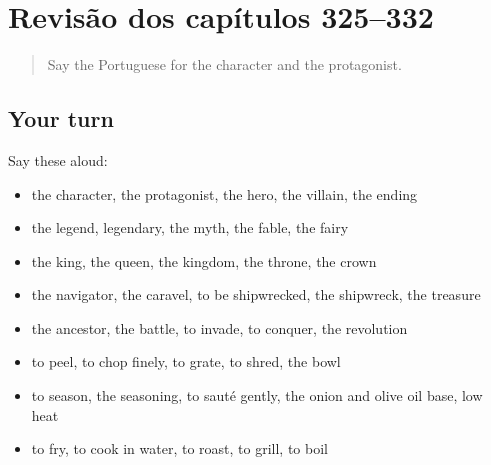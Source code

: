 \section[(dialogue)]{Revisão dos capítulos 325–332}

\label{lesson:PT-R332-revisao-325-332}



\begin{quote}
Say the Portuguese for the character and the protagonist.
\end{quote}

\subsection*{Your turn}
Say these aloud:

\begin{itemize}
\raggedright
  \item the character, the protagonist, the hero, the villain, the ending
  \item the legend, legendary, the myth, the fable, the fairy
  \item the king, the queen, the kingdom, the throne, the crown
  \item the navigator, the caravel, to be shipwrecked, the shipwreck, the treasure
  \item the ancestor, the battle, to invade, to conquer, the revolution
  \item to peel, to chop finely, to grate, to shred, the bowl
  \item to season, the seasoning, to sauté gently, the onion and olive oil base, low heat
  \item to fry, to cook in water, to roast, to grill, to boil
\end{itemize}

